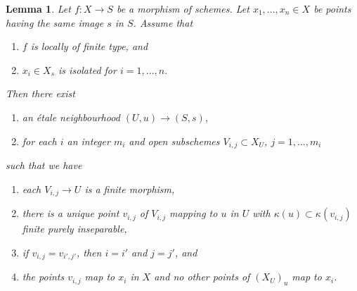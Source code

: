 \documentclass[10pt,a4paper]{amsart}
\theoremstyle{plain}
\newtheorem{lemma}[subsection]{Lemma}
\theoremstyle{definition}
\theoremstyle{remark}
\numberwithin{equation}{subsection}
\begin{document}
\begin{lemma}
\label{lemma-etale-makes-quasi-finite-finite-multiple-points-var}
Let $f : X \to S$ be a morphism of schemes.
Let $x_1, \ldots, x_n \in X$ be points having the same image $s$ in $S$.
Assume that
\begin{enumerate}
\item $f$ is locally of finite type, and
\item $x_i \in X_s$ is isolated for $i = 1, \ldots, n$.
\end{enumerate}
Then there exist
\begin{enumerate}
\item[(a)] an \'etale neighbourhood $(U, u) \to (S, s)$,
\item[(b)] for each $i$ an integer $m_i$ and
open subschemes $V_{i, j} \subset X_U$, $j = 1, \ldots, m_i$
\end{enumerate}
such that we have
\begin{enumerate}
\item[(\romannumeral1)] each $V_{i, j} \to U$ is a finite morphism,
\item[(\romannumeral2)] there is a unique point $v_{i, j}$ of $V_{i, j}$
mapping to $u$ in $U$ with $\kappa(u) \subset \kappa(v_{i, j})$
finite purely inseparable,
\item[(\romannumeral4)] if $v_{i, j} = v_{i', j'}$, then $i = i'$ and
$j = j'$, and
\item[(\romannumeral3)] the points $v_{i, j}$ map to $x_i$ in $X$ and
no other points of $(X_U)_u$ map to $x_i$.
\end{enumerate}
\end{lemma}
\end{document}
